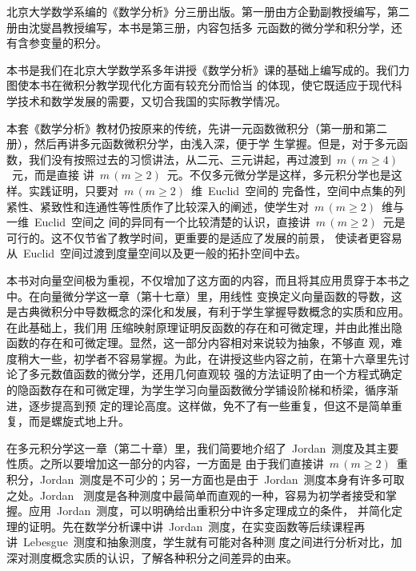 
\begin{preface}
北京大学数学系编的《数学分析》分三册出版。第一册由方企勤副教授编写，第二册由沈燮昌教授编写，本书是第三册，内容包括多
元函数的微分学和积分学，还有含参变量的积分。

本书是我们在北京大学数学系多年讲授《数学分析》课的基础上编写成的。我们力图使本书在微积分教学现代化方面有较充分而恰当
的体现，使它既适应于现代科学技术和数学发展的需要，又切合我国的实际教学情况。

本套《数学分析》教材仍按原来的传统，先讲一元函数微积分（第一册和第二册），然后再讲多元函数微积分学，由浅入深，便于学
生掌握。但是，对于多元函数，我们没有按照过去的习惯讲法，从二元、三元讲起，再过渡到~$m\,(m\geq 4)$~元，而是直接
讲~$m\,(m\geq 2)$~元。不仅多元微分学是这样，多元积分学也是这样。实践证明，只要对~$m\,(m\geq 2)$~维~Euclid~空间的
完备性，空间中点集的列紧性、紧致性和连通性等性质作了比较深入的阐述，使学生对~$m\,(m\geq 2)$~维与一维~Euclid~空间之
间的异同有一个比较清楚的认识，直接讲~$m\,(m\geq 2)$~元是可行的。这不仅节省了教学时间，更重要的是适应了发展的前景，%
使读者更容易从~Euclid~空间过渡到度量空间以及更一般的拓扑空间中去。

本书对向量空间极为重视，不仅增加了这方面的内容，而且将其应用贯穿于本书之中。在向量微分学这一章（第十七章）里，用线性
变换定义向量函数的导数，这是古典微积分中导数概念的深化和发展，有利于学生掌握导数概念的实质和应用。在此基础上，我们用
压缩映射原理证明反函数的存在和可微定理，并由此推出隐函数的存在和可微定理。显然，这一部分内容相对来说较为抽象，不够直
观，难度稍大一些，初学者不容易掌握。为此，在讲授这些内容之前，在第十六章里先讨论了多元数值函数的微分学，还用几何直观较
强的方法证明了由一个方程式确定的隐函数存在和可微定理，为学生学习向量函数微分学铺设阶梯和桥梁，循序渐进，逐步提高到预
定的理论高度。这样做，免不了有一些重复，但这不是简单重复，而是螺旋式地上升。

在多元积分学这一章（第二十章）里，我们简要地介绍了~Jordan~测度及其主要性质。之所以要增加这一部分的内容，一方面是
由于我们直接讲~$m\,(m\geq 2)$~重积分，Jordan~测度是不可少的；另一方面也是由于~Jordan~测度本身有许多可取之处。Jordan~
测度是各种测度中最简单而直观的一种，容易为初学者接受和掌握。应用~Jordan~测度，可以明确给出重积分中许多定理成立的条件，%
并简化定理的证明。先在数学分析课中讲~Jordan~测度，在实变函数等后续课程再讲~Lebesgue~测度和抽象测度，学生就有可能对各种测
度之间进行分析对比，加深对测度概念实质的认识，了解各种积分之间差异的由来。


\end{preface}
